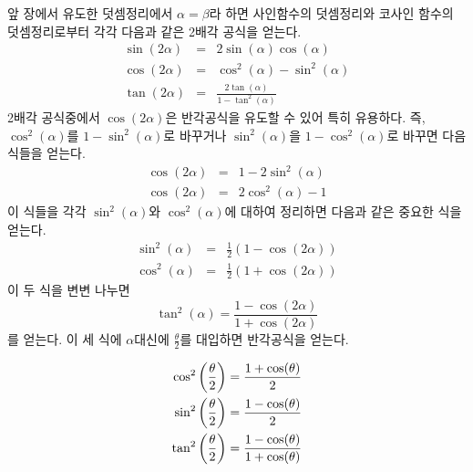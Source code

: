 \documentclass[11pt, a4paper]{book}
\begin{document}
  앞 장에서 유도한 덧셈정리에서  $\alpha = \beta$라 하면 사인함수의 덧셈정리와 코사인 함수의 덧셈정리로부터 각각 다음과 같은 2배각 공식을 얻는다.
	\begin{eqnarray*}
		\sin(2\alpha) &=&  2\sin(\alpha)\cos(\alpha) \\
		\cos(2\alpha) &=& \cos^2(\alpha) - \sin^2(\alpha)\\
		\tan(2\alpha) &=& \frac{2 \tan(\alpha)}{1-\tan^{2}(\alpha)}
	\end{eqnarray*}
2배각 공식중에서 $\cos(2\alpha)$은 반각공식을 유도할 수 있어 특히 유용하다. 즉, $\cos^2(\alpha)$를 $1-\sin^2(\alpha)$로 바꾸거나 $\sin^2(\alpha)$을 $1-\cos^2(\alpha)$로 바꾸면 다음 식들을 얻는다.
	\begin{eqnarray*}
		\cos(2\alpha) &=& 1 - 2\sin^2(\alpha) \\
		\cos(2\alpha) &=& 2\cos^2(\alpha) - 1
	\end{eqnarray*}
이 식들을 각각 $\sin^2(\alpha)$와 $\cos^2(\alpha)$에 대하여 정리하면 다음과 같은 중요한 식을 얻는다.
	\begin{eqnarray*}
		\sin^2(\alpha) &=& \frac{1}{2}(1 - \cos(2\alpha)) \\
		\cos^2(\alpha) &=& \frac{1}{2}(1 + \cos(2\alpha))
	\end{eqnarray*}
 이 두 식을 변변 나누면
 \[
 \tan^{2}(\alpha) =\frac{1-\cos(2\alpha)}{1+\cos(2\alpha)}
 \]
 를 얻는다. 이 세 식에 $\alpha$대신에 $\frac{\theta}{2}$를 대입하면 반각공식을 얻는다.
 \begin{theorem}[반각공식]\vspace{-2em}
 	\begin{align*}\vspace{-2em}
 	\cos^{2}\left(\frac{\theta}{2} \right) &= \frac{1+ \cos(\theta)}{2}\\
 	\sin^{2}\left(\frac{\theta}{2} \right) &= \frac{1- \cos(\theta)}{2}\\
 	\tan^{2}\left(\frac{\theta}{2} \right) &= \frac{1- \cos(\theta)}{1+ \cos(\theta)}
 	\end{align*}
 \end{theorem}
\end{document}
